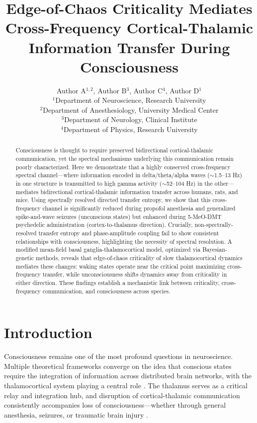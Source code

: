 \documentclass[12pt]{article}
\title{Edge-of-Chaos Criticality Mediates Cross-Frequency Cortical-Thalamic Information Transfer During Consciousness}
\author{Author A$^{1,2}$, Author B$^{3}$, Author C$^{4}$, Author D$^{1}$ \\
\small $^{1}$Department of Neuroscience, Research University \\
\small $^{2}$Department of Anesthesiology, University Medical Center \\
\small $^{3}$Department of Neurology, Clinical Institute \\
\small $^{4}$Department of Physics, Research University}
\date{}
\begin{document}
\maketitle

\begin{abstract}
Consciousness is thought to require preserved bidirectional cortical-thalamic communication, yet the spectral mechanisms underlying this communication remain poorly characterized. Here we demonstrate that a highly conserved cross-frequency spectral channel---where information encoded in delta/theta/alpha waves ($\sim$1.5--13 Hz) in one structure is transmitted to high gamma activity ($\sim$52--104 Hz) in the other---mediates bidirectional cortical-thalamic information transfer across humans, rats, and mice. Using spectrally resolved directed transfer entropy, we show that this cross-frequency channel is significantly reduced during propofol anesthesia and generalized spike-and-wave seizures (unconscious states) but enhanced during 5-MeO-DMT psychedelic administration (cortex-to-thalamus direction). Crucially, non-spectrally-resolved transfer entropy and phase-amplitude coupling fail to show consistent relationships with consciousness, highlighting the necessity of spectral resolution. A modified mean-field basal ganglia-thalamocortical model, optimized via Bayesian-genetic methods, reveals that edge-of-chaos criticality of slow thalamocortical dynamics mediates these changes: waking states operate near the critical point maximizing cross-frequency transfer, while unconsciousness shifts dynamics away from criticality in either direction. These findings establish a mechanistic link between criticality, cross-frequency communication, and consciousness across species.
\end{abstract}

\section{Introduction}

Consciousness remains one of the most profound questions in neuroscience. Multiple theoretical frameworks converge on the idea that conscious states require the integration of information across distributed brain networks, with the thalamocortical system playing a central role \citep{tononi2004information, mashour2020conscious}. The thalamus serves as a critical relay and integration hub, and disruption of cortical-thalamic communication consistently accompanies loss of consciousness---whether through general anesthesia, seizures, or traumatic brain injury \citep{alkire2008consciousness}.
\end{document}

